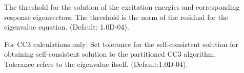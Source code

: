 \begin{description}
\item[] 

The threshold for the solution of the excitation energies and
corresponding response eigenvectors. 
The threshold is the norm of the residual for the eigenvalue equation.
(Default: 1.0D-04). 

%
%
%
%
%
%
%
\item[] 
%
For CC3 calculations only: 
Set tolerance for the self-consistent solution for obtaining self-consistent
solution to the partitioned CC3 algorithm.
Tolerance refers to the eigenvalue itself.
(Default:1.0D-04).


%
%
\end{description}
